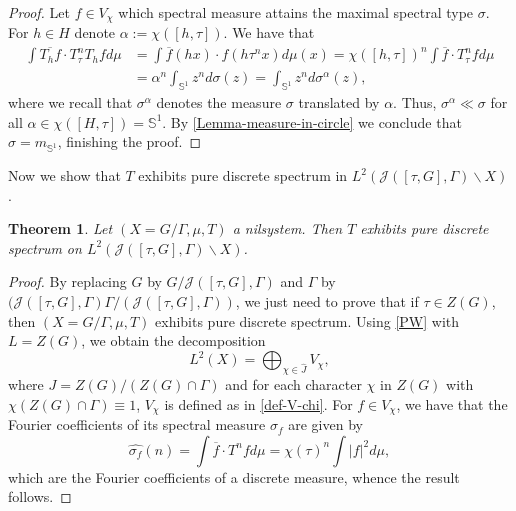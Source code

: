 \documentclass[letter, 11pt]{article}
\newtheorem{theorem}{Theorem}[section]
\theoremstyle{definition}
\theoremstyle{plain}
\newcommand{\bS}{\mathbb{S}}
\newcommand{\1}{\mathbbm{1}}
\begin{document}
\begin{proof}
    Let $f\in V_\chi$ which spectral measure attains the maximal spectral type $\sigma$. For $h\in H$ denote $\alpha:=  \chi([h,\tau])$. We have that 
    \begin{align*}
       \int \overline{T_hf} \cdot T_\tau^nT_hfd\mu&= \int \overline{f}(hx)\cdot  f(h\tau^nx) d\mu(x)= \chi([h,\tau])^n\int \overline{f}\cdot T_\tau^nf d\mu\\
       &= \alpha^n \int_{\bS^1} z^n d\sigma(z)= \int_{\bS^1} z^n d\sigma^\alpha(z),
    \end{align*}
where we recall that $\sigma^\alpha$ denotes the measure $\sigma$ translated by $\alpha$. Thus, $\sigma^\alpha\ll \sigma$ for all $\alpha\in \chi([H,\tau])=\bS^1    $. By \cref{Lemma-measure-in-circle} we conclude that $\sigma=m_{\bS^1}$, finishing the proof.  
\end{proof}


Now we show that $T$ exhibits pure discrete spectrum in $L^2(\mathcal{J}([\tau,G],\Gamma)\backslash X)$. 
\begin{theorem}\label{main-theorem}
    Let $(X=G/\Gamma,\mu,T)$ a nilsystem. Then $T$ exhibits pure discrete spectrum on $L^2(\mathcal{J}([\tau,G],\Gamma)\backslash X)$. 
\end{theorem}
\begin{proof}
    By replacing $G$ by $G/\mathcal{J}([\tau,G],\Gamma)$ and $\Gamma$ by $ (\mathcal{J}([\tau,G],\Gamma)\Gamma/ (\mathcal{J}([\tau,G],\Gamma))$, we just need to prove that if $\tau\in Z(G)$, then $(X=G/\Gamma,\mu,T)$ exhibits pure discrete spectrum. Using \cref{PW} with $L=Z(G)$, we obtain the decomposition 
    $$ L^2(X)= \bigoplus_{\chi \in \widehat{J}} V_\chi,$$
    where $J=Z(G)/ (Z(G)\cap \Gamma)$ and for each character $\chi$ in $Z(G)$ with $\chi(Z(G)\cap \Gamma)\equiv 1$, $V_\chi$ is defined as in \cref{def-V-chi}. For $f\in V_\chi$, we have that the Fourier coefficients of its spectral measure $\sigma_f$ are given by 
    $$\widehat{\sigma_f}(n)=\int \overline{f}\cdot  T^n f d\mu= \chi(\tau)^n \int |f|^2 d\mu,$$
    which are the Fourier coefficients of a discrete measure, whence the result follows. 
\end{proof}
\end{document}

